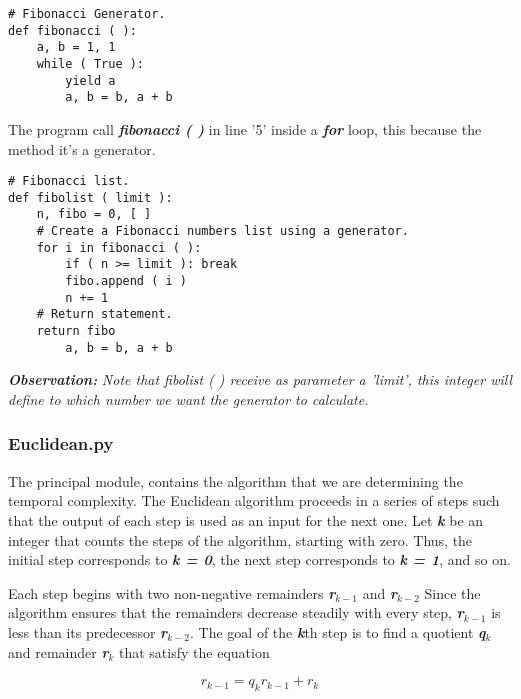 \documentclass[10pt,a4paper]{article}
\begin{document}
\begin{lstlisting}
# Fibonacci Generator.
def fibonacci ( ):
    a, b = 1, 1
    while ( True ):
        yield a
        a, b = b, a + b
\end{lstlisting} \hfill 

The program call {\bfseries\itshape fibonacci ( )} in line '5' inside a {\bfseries\itshape for} loop, this because the method it's a generator. \hfill \break

\begin{lstlisting}
# Fibonacci list.
def fibolist ( limit ):
    n, fibo = 0, [ ]
    # Create a Fibonacci numbers list using a generator.
    for i in fibonacci ( ):
        if ( n >= limit ): break
        fibo.append ( i )
        n += 1
    # Return statement.
    return fibo
        a, b = b, a + b
\end{lstlisting}

{\bfseries\itshape Observation:} {\itshape Note that fibolist ( ) receive as parameter a 'limit', this integer will define to which number we want the generator to calculate.}

\pagebreak

\subsubsection{Euclidean.py}

The principal module, contains the algorithm that we are determining the temporal complexity. The Euclidean algorithm proceeds in a series of steps such that the output of each step is used as an input for the next one. Let {\bfseries\itshape k} be an integer that counts the steps of the algorithm, starting with zero. Thus, the initial step corresponds to {\bfseries\itshape k = 0}, the next step corresponds to {\bfseries\itshape k = 1}, and so on. \hfil \break

Each step begins with two non-negative remainders {\bfseries\itshape r$_{k-1}$} and {\bfseries\itshape r$_{k-2}$} Since the algorithm ensures that the remainders decrease steadily with every step, {\bfseries\itshape r$_{k-1}$} is less than its predecessor {\bfseries\itshape r$_{k-2}$}. The goal of the {\bfseries\itshape k}th step is to find a quotient {\bfseries\itshape q$_{k}$} and remainder {\bfseries\itshape r$_{k}$} that satisfy the equation

\begin{equation}
r_{k-1} = q_{k}r_{k-1} + r_{k}
\end{equation}
\end{document}
